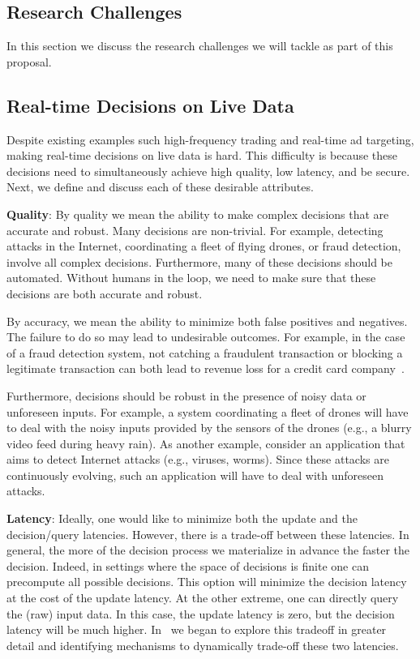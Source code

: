 \subsection{Research Challenges }

In this section we discuss the research challenges we will tackle as part of this proposal.


\subsection{Real-time Decisions on Live Data} 

Despite existing examples such high-frequency trading and real-time ad targeting, making real-time decisions on live data is hard. This difficulty is because these decisions need to simultaneously achieve high quality, low latency, and be secure. Next, we define and discuss each of these desirable attributes.

{\bf Quality}: By quality we mean the ability to make complex decisions that are accurate and robust. Many decisions are non-trivial. For example, detecting attacks in the Internet, coordinating a fleet of flying drones, or fraud detection, involve all complex decisions. Furthermore, many of these decisions should be automated. Without humans in the loop, we need to make sure that these decisions are both accurate and robust. 

By accuracy, we mean the ability to minimize both false positives and negatives. The failure to do so may lead to undesirable outcomes. For example, in the case of a fraud detection system, not catching a fraudulent transaction or blocking a legitimate transaction can both lead to revenue loss for a credit card company~\cite{Sculley11}. 

Furthermore, decisions should be robust in the presence of noisy data or unforeseen inputs. For example, a system coordinating a fleet of drones will have to deal with the noisy inputs provided by the sensors of the drones (e.g., a blurry video feed during heavy rain). As another example, consider an application that aims to detect Internet attacks (e.g., viruses, worms). Since these attacks are continuously evolving, such an application will have to deal with unforeseen attacks.

{\bf Latency}:  Ideally, one would like to minimize both the update and the decision/query latencies. However, there is a trade-off between these latencies.  In general, the more of the decision process we materialize in advance the faster the decision. Indeed, in settings where the space of decisions is finite one can precompute all possible decisions. This option will minimize the decision latency at the cost of the update latency.  At the other extreme, one can directly query the (raw) input data. In this case, the update latency is zero, but the decision latency will be much higher.  In~\cite{crankshaw15} we began to explore this tradeoff in greater detail and identifying mechanisms to dynamically trade-off these two latencies.

